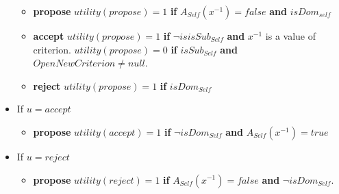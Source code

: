 \documentclass{article}
\begin{document}
\begin{itemize}
\begin{itemize}
		\item \textbf{propose}
			\subitem $utility(propose) = 1$ \textbf{ if } $A_{Self} (x^{-1})= false$ \textbf{ and } $isDom_{self}$

		\item \textbf{accept}
			\subitem $utility(propose) = 1$ \textbf{ if } $ \neg isisSub_{Self}$ \textbf{ and } $x^{-1}$ is a value of criterion. 
			\subitem $utility(propose) = 0$  \textbf{ if } $isSub_{Self}$ \textbf{ and } $OpenNewCriterion \not= null$.
		\item \textbf{reject}
		\subitem $utility(propose) = 1$ \textbf{ if } $isDom_{Self}$

		
		
	\end{itemize}
	
		\item If $u =accept$
		\begin{itemize}
				\item \textbf{propose}	
				\subitem $utility(accept) = 1$ \textbf{ if } $ \neg isDom_{Self}$ \textbf{ and }  $A_{Self} (x^{-1}) = true$ 

			
		\end{itemize}

\item If $u =reject$
\begin{itemize}
	\item \textbf{propose}	
	\subitem $utility(reject) = 1$  \textbf{ if } $A_{Self} (x^{-1}) = false$ \textbf{ and } $\neg isDom_{Self}$.


\end{itemize}


\end{itemize}
\end{document}
